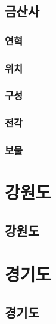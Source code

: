 \documentclass[12pt, a4paper, oneside]{book}
\let\stdsection\section
\renewcommand\section{\newpage\stdsection}
\begin{document}
	\chapter{금산사}
	\minitoc


		\section{연혁}

		\section{위치}

		\section{구성}

		\section{전각}

		\section{보물}


	\part{ 강원도 }
	\noptcrule
	\parttoc				


	\chapter{ 강원도 }




	\part{ 경기도 }
	\noptcrule
	\parttoc				


	\chapter{ 경기도 }
\end{document}
